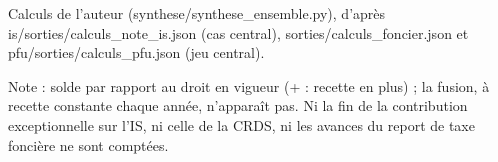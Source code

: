 Calculs de l'auteur (synthese/synthese\_ensemble.py), d'après is/sorties/calculs\_note\_is.json (cas central), sorties/calculs\_foncier.json et pfu/sorties/calculs\_pfu.json (jeu central).\par Note : solde par rapport au droit en vigueur (+ : recette en plus) ; la fusion, à recette constante chaque année, n'apparaît pas. Ni la fin de la contribution exceptionnelle sur l'IS, ni celle de la CRDS, ni les avances du report de taxe foncière ne sont comptées.
